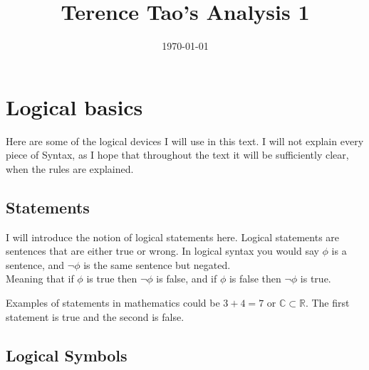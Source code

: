 \documentclass[]{scrbook}
\title{Terence Tao's Analysis 1}
\author{}
\date{\today}
\begin{document}
\maketitle
\newpage
\tableofcontents
\newpage

\chapter{Logical basics}

Here are some of the logical devices I will use in this text. I will not explain every piece of Syntax, as I hope that throughout the text it will be sufficiently clear, when the rules are explained.

\section{Statements}

I will introduce the notion of logical statements here. Logical statements are sentences that are either true or wrong. In logical syntax you would say $\phi$ is a sentence, and $\neg\phi$ is the same sentence but negated. \\
Meaning that if $\phi$ is true then $\neg\phi$ is false, and if $\phi$ is false then $\neg\phi$ is true. 

Examples of statements in mathematics could be $3 + 4 = 7$ or $\mathbb{C}\subset\mathbb{R}$. The first statement is true and the second is false.

\section{Logical Symbols}
\end{document}
